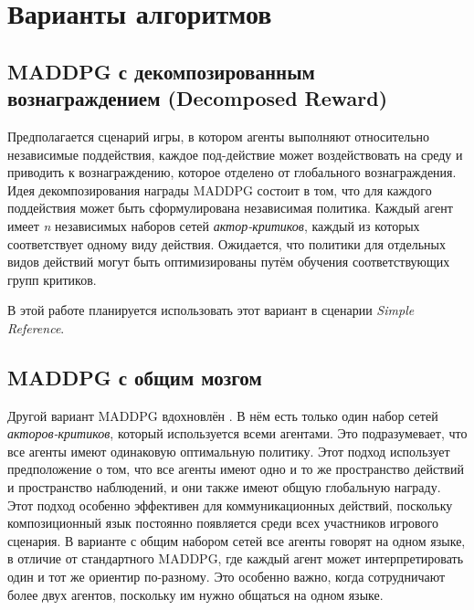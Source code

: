 \section{Варианты алгоритмов}

\subsection{MADDPG с декомпозированным вознаграждением (Decomposed Reward)}

Предполагается сценарий игры, в котором агенты выполняют относительно независимые поддействия, каждое под-действие может воздействовать на среду и приводить к вознаграждению, которое отделено от глобального вознаграждения. Идея декомпозирования награды MADDPG состоит в том, что для каждого поддействия может быть сформулирована независимая политика. Каждый агент имеет \textit{n} независимых наборов сетей \textit{актор-критиков}, каждый из которых соответствует одному виду действия. Ожидается, что политики для отдельных видов действий могут быть оптимизированы путём обучения соответствующих групп критиков.

В этой работе планируется использовать этот вариант в сценарии \textit{Simple Reference}.

\subsection{MADDPG с общим мозгом}

Другой вариант MADDPG вдохновлён \cite{mordatch2017emergence}. В нём есть только один набор сетей \textit{акторов-критиков}, который используется всеми агентами. Это подразумевает, что все агенты имеют одинаковую оптимальную политику. Этот подход использует предположение о том, что все агенты имеют одно и то же пространство действий и пространство наблюдений, и они также имеют общую глобальную награду. Этот подход особенно эффективен для коммуникационных действий, поскольку композиционный язык постоянно появляется среди всех участников игрового сценария. В варианте с общим набором сетей все агенты говорят на одном языке, в отличие от стандартного MADDPG, где каждый агент может интерпретировать один и тот же ориентир по-разному. Это особенно важно, когда сотрудничают более двух агентов, поскольку им нужно общаться на одном языке.
